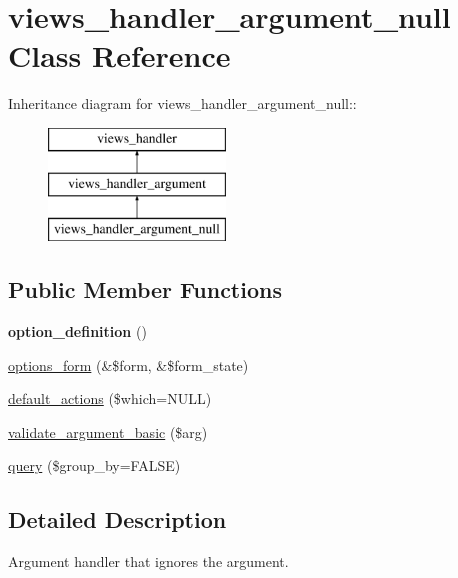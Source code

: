 \hypertarget{classviews__handler__argument__null}{
\section{views\_\-handler\_\-argument\_\-null Class Reference}
\label{classviews__handler__argument__null}
}
Inheritance diagram for views\_\-handler\_\-argument\_\-null::\begin{figure}[H]
\begin{center}
\leavevmode
\includegraphics[height=3cm]{classviews__handler__argument__null}
\end{center}
\end{figure}
\subsection*{Public Member Functions}
\begin{DoxyCompactItemize}
\item 
\hypertarget{classviews__handler__argument__null_a8ba4c40627657d548ad011a1e203d00f}{
{\bfseries option\_\-definition} ()}
\label{classviews__handler__argument__null_a8ba4c40627657d548ad011a1e203d00f}

\item 
\hyperlink{classviews__handler__argument__null_a414f383de12d08f6e1e5eccb572cf9c8}{options\_\-form} (\&\$form, \&\$form\_\-state)
\item 
\hyperlink{classviews__handler__argument__null_a82da8fd1448e1ce346aa38d5b6021e05}{default\_\-actions} (\$which=NULL)
\item 
\hyperlink{classviews__handler__argument__null_afc4fd62d96247a2ebebbd7e44f0742ce}{validate\_\-argument\_\-basic} (\$arg)
\item 
\hyperlink{classviews__handler__argument__null_ab2358d01dc1374da42a1ae45dff90dae}{query} (\$group\_\-by=FALSE)
\end{DoxyCompactItemize}


\subsection{Detailed Description}
Argument handler that ignores the argument. 

